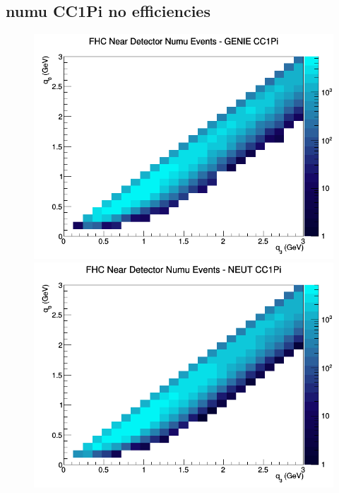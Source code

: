 \documentclass[12pt]{article}
\begin{document}
\subsection{numu CC1Pi no efficiencies}
\begin{figure}[h]
\includegraphics[width=\linewidth]{q0_q3/nominal/CC1Pi_FHC_ND_numu_q3_q0_GENIE.png}
\endminipage
{}
\includegraphics[width=\linewidth]{q0_q3/nominal/CC1Pi_FHC_ND_numu_q3_q0_NEUT.png}
\endminipage
{}

\end{figure}
\end{document}
